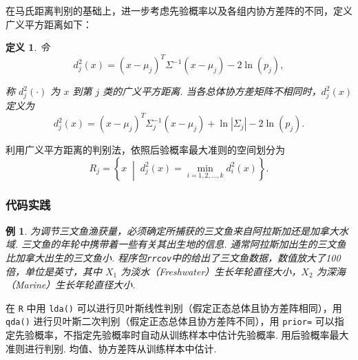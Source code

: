 \documentclass[12pt, a4paper, oneside]{ctexart}
\newtheorem{definition}[theorem]{定义}
\newtheorem{example}[theorem]{例}
\begin{document}
	在马氏距离判别的基础上，进一步考虑先验概率以及各组内协方差阵的不同，定义广义平方距离如下：
	\begin{definition}
		令
		\[
		d_j^2(x) = (x - \mu_j)^T \Sigma^{-1} (x - \mu_j) - 2 \ln(p_j),
		\]
		
		称 $d_j^2(\cdot)$ 为 $x$ 到第 $j$ 类的广义平方距离.
		当各总体协方差矩阵不相同时，$d_j^2(x)$ 定义为
		\[
		d_j^2(x) = (x - \mu_j)^T \Sigma_j^{-1} (x - \mu_j) + \ln |\Sigma_j| - 2 \ln(p_j).
		\]
	\end{definition}
	利用广义平方距离的判别法，依照后验概率最大准则的空间划分为
	\[
	R_j = \left\{ x \;\middle|\; d_j^2(x) = \min_{i = 1,2,\ldots,k} d_i^2(x) \right\}.
	\]
	
	\subsubsection{代码实践}
	\begin{example}
		为调节三文鱼渔获量，必须确定所捕获的三文鱼来自阿拉斯加还是加拿大水域. 三文鱼的年轮中携带着一些有关其出生地的信息. 通常阿拉斯加出生的三文鱼比加拿大出生的三文鱼小. 程序包\texttt{rrcov}中的给出了三文鱼数据，数值放大了100倍，单位是英寸，其中 $X_{1}$ 为淡水（Freshwater）生长年轮直径大小，$X_{2}$ 为深海（Marine）生长年轮直径大小.
	\end{example}
	
	在 \texttt{R} 中用 \texttt{lda()} 可以进行贝叶斯线性判别（假定正态总体且协方差阵相同），用 \texttt{qda()} 进行贝叶斯二次判别（假定正态总体且协方差阵不同），用 \texttt{prior=} 可以指定先验概率，不指定先验概率时自动从训练样本中估计先验概率. 用后验概率最大准则进行判别. 均值、协方差阵从训练样本中估计.
	
\end{document}
